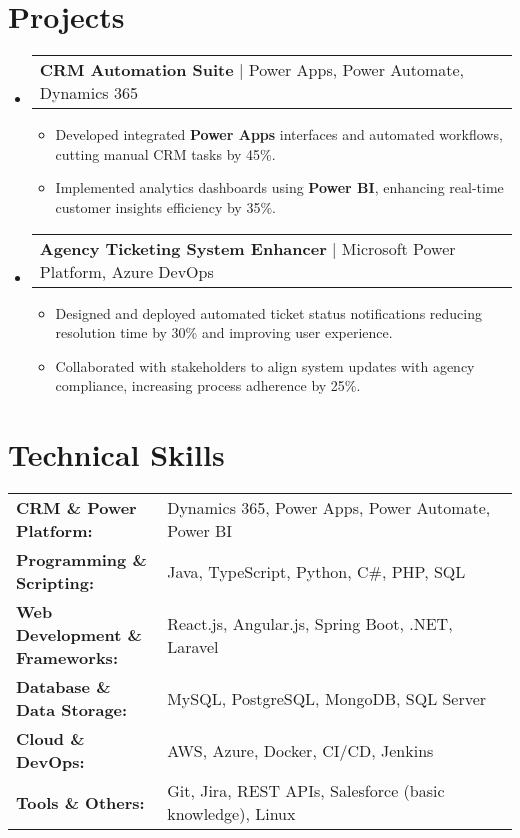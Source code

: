 \documentclass[letterpaper,11pt]{article}
\makeatletter
\newcommand{\resumeItem}[1]{
  \item\footnotesize{
    {#1 \vspace{-2pt}}
  }
}
\newcommand{\resumeProjectHeading}[2]{
    \item
    \begin{tabular*}{1.001\textwidth}{l@{\extracolsep{\fill}}r}
      \small#1 & \textbf{\small #2}\\
    \end{tabular*}\vspace{-7pt}
}
\newcommand{\resumeSubHeadingListStart}{\begin{itemize}[leftmargin=0pt, label={}]}
\newcommand{\resumeSubHeadingListEnd}{\end{itemize}}
\newcommand{\resumeItemListStart}{\begin{itemize}[leftmargin=*]}
\newcommand{\resumeItemListEnd}{\end{itemize}\vspace{-5pt}}
\makeatother
\begin{document}
\section{Projects}
    \vspace{-5pt}
    \resumeSubHeadingListStart
      \resumeProjectHeading
          {\textbf{CRM Automation Suite} | Power Apps, Power Automate, Dynamics 365}
          {}
          \resumeItemListStart
              \resumeItem{Developed integrated \textbf{Power Apps} interfaces and automated workflows, cutting manual CRM tasks by 45\%.}
              \resumeItem{Implemented analytics dashboards using \textbf{Power BI}, enhancing real-time customer insights efficiency by 35\%.}
          \resumeItemListEnd
          \vspace{-16pt}
      \resumeProjectHeading
          {\textbf{Agency Ticketing System Enhancer} | Microsoft Power Platform, Azure DevOps}
          {}
          \resumeItemListStart
              \resumeItem{Designed and deployed automated ticket status notifications reducing resolution time by 30\% and improving user experience.}
              \resumeItem{Collaborated with stakeholders to align system updates with agency compliance, increasing process adherence by 25\%.}
          \resumeItemListEnd
          \vspace{-16pt}
    \resumeSubHeadingListEnd
\vspace{-10pt}
\section{Technical Skills}
        \vspace{-14pt}
        \begin{table}[h]
            \footnotesize
            \begin{tabular}{p{0.3\linewidth} p{0.7\linewidth}}
                \textbf{CRM \& Power Platform:} & Dynamics 365, Power Apps, Power Automate, Power BI \\
                \textbf{Programming \& Scripting:} & Java, TypeScript, Python, C\#, PHP, SQL \\
                \textbf{Web Development \& Frameworks:} & React.js, Angular.js, Spring Boot, .NET, Laravel \\
                \textbf{Database \& Data Storage:} & MySQL, PostgreSQL, MongoDB, SQL Server \\
                \textbf{Cloud \& DevOps:} & AWS, Azure, Docker, CI/CD, Jenkins \\
                \textbf{Tools \& Others:} & Git, Jira, REST APIs, Salesforce (basic knowledge), Linux \\
            \end{tabular}
        \end{table}
\end{document}
